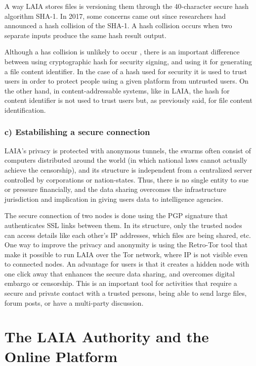 \documentclass[conference,final,]{IEEEtran}
\begin{document}
A way LAIA stores files is versioning them through the 40-character
secure hash algorithm SHA-1. In 2017, some concerns came out since
researchers had announced a hash collision of the SHA-1. A hash
collision occurs when two separate inputs produce the same hash result
output.

Although a has collision is unlikely to occur , there is an important
difference between using cryptographic hash for security signing, and
using it for generating a file content identifier. In the case of a hash
used for security it is used to trust users in order to protect people
using a given platform from untrusted users. On the other hand, in
content-addressable systems, like in LAIA, the hash for content
identifier is not used to trust users but, as previously said, for file
content identification.

\hypertarget{c-estabilishing-a-secure-connection}{%
\subsubsection{c) Estabilishing a secure
connection}\label{c-estabilishing-a-secure-connection}}

LAIA's privacy is protected with anonymous tunnels, the swarms often
consist of computers distributed around the world (in which national
laws cannot actually achieve the censorship), and its structure is
independent from a centralized server controlled by corporations or
nation-states. Thus, there is no single entity to sue or pressure
financially, and the data sharing overcomes the infrastructure
jurisdiction and implication in giving users data to intelligence
agencies.

The secure connection of two nodes is done using the PGP signature that
authenticates SSL links between them. In its structure, only the trusted
nodes can access details like each other's IP addresses, which files are
being shared, etc. One way to improve the privacy and anonymity is using
the Retro-Tor tool that make it possible to run LAIA over the Tor
network, where IP is not visible even to connected nodes. An advantage
for users is that it creates a hidden node with one click away that
enhances the secure data sharing, and overcomes digital embargo or
censorship. This is an important tool for activities that require a
secure and private contact with a trusted persons, being able to send
large files, forum posts, or have a multi-party discussion.


\hypertarget{the_laia-authority-and-the-online-platform}{%
\section{The LAIA Authority and the Online Platform}
\label{the_laia-authority-and-the-online-platform}}
\end{document}
